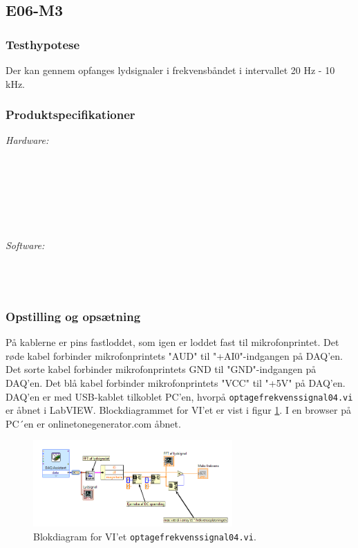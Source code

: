 \subsection{E06-M3}
\label{subsec:E06}
		\subsubsection{Testhypotese}
		Der kan gennem \elektret{} opfanges lydsignaler i frekvensbåndet i intervallet 20 Hz - 10 kHz.
	
		
		\subsubsection{Produktspecifikationer}
	
			\textit{Hardware:}\\
			\elektret\\
			\pinstre\\
			\mikrofonkabel\\
			\krympeflex\\
			\daq\\
			\daqusb\\			
			\PC
	
			\textit{Software:}\\
			\labview\\
			\daqsoft\\
			\onlineg\\
	
		\subsubsection{Opstilling og opsætning}
		På kablerne er pins fastloddet, som igen er loddet fast til mikrofonprintet. Det røde kabel forbinder mikrofonprintets "AUD"{} til "+AI0"{}-indgangen på DAQ'en. Det sorte kabel forbinder mikrofonprintets GND til "GND"{}-indgangen på DAQ'en. Det blå kabel forbinder mikrofonprintets "VCC"{} til "+5V"{} på DAQ'en. DAQ'en er med USB-kablet tilkoblet PC'en, hvorpå \texttt{optagefrekvenssignal04.vi} er åbnet i LabVIEW. Blockdiagrammet for VI'et er vist i figur \ref{fig:webvi}. I en browser på PC´en er onlinetonegenerator.com åbnet.    
		
		\begin{figure}
			\centering
			\includegraphics[width=3in]{optagefrekvenssignal04}
			\caption{Blokdiagram for VI'et \texttt{optagefrekvenssignal04.vi}.}
			\label{fig:webvi}
		\end{figure}
		
